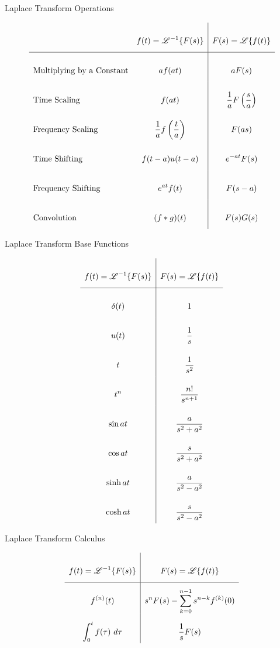 \documentclass{article}
\begin{document}
    \begin{table}[h]
        \centering
        \caption{Laplace Transform Operations}
        $$\def\arraystretch{3}
        \begin{array}{>$l<$>{\displaystyle}c|>{\displaystyle}c}
            & f(t) = \mathscr{L}^{-1}\{F(s)\} & F(s) = \mathscr{L}\{f(t)\} \\
            \hline
            Multiplying by a Constant & af(at) & aF(s) \\
            Time Scaling & f(at) & \frac{1}{a}F\left(\frac{s}{a}\right) \\
            Frequency Scaling & \frac{1}{a}f\left(\frac{t}{a}\right) & F(as) \\
            Time Shifting & f(t - a)u(t - a) & e^{-at}F(s) \\
            Frequency Shifting & e^{at} f(t) & F(s - a) \\
            Convolution & (f * g)(t) & F(s)G(s) \\
        \end{array}$$
    \end{table}

    \begin{table}[h]
        \centering
        \caption{Laplace Transform Base Functions}
        $$\def\arraystretch{3}
        \begin{array}{>{\displaystyle}c|>{\displaystyle}c}
            f(t) = \mathscr{L}^{-1}\{F(s)\} & F(s) = \mathscr{L}\{f(t)\} \\
            \hline
            \delta(t) & 1 \\
            u(t) & \frac{1}{s} \\
            t & \frac{1}{s^2} \\
            t^n & \frac{n!}{s^{n + 1}} \\
            \sin{at} & \frac{a}{s^2 + a^2} \\
            \cos{at} & \frac{s}{s^2 + a^2} \\
            \sinh{at} & \frac{a}{s^2 - a^2} \\
            \cosh{at} & \frac{s}{s^2 - a^2} \\
        \end{array}$$
    \end{table}

    \begin{table}[h]
        \centering
        \caption{Laplace Transform Calculus}
        $$\def\arraystretch{3}
        \begin{array}{>{\displaystyle}c|>{\displaystyle}c}
            f(t) = \mathscr{L}^{-1}\{F(s)\} & F(s) = \mathscr{L}\{f(t)\} \\
            \hline
            f^{(n)}(t) & s^nF(s) - \sum_{k = 0}^{n - 1}{s^{n - k}f^{(k)}(0)} \\
            \int_0^t{f(\tau)\ d\tau} & \frac{1}{s}F(s) \\
        \end{array}$$
    \end{table}
\end{document}
